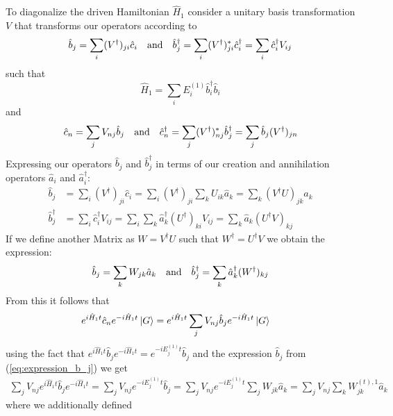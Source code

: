 \documentclass[11pt, a4paper]{article}
\theoremstyle{definition} %
\begin{document}
	 To diagonalize the driven Hamiltonian $\hat{H}_1$ consider a unitary basis transformation $V$ that transforms our operators according to
	\begin{equation}
		\hat{b}_j = \sum_i (V^\dagger)_{ji} \hat{c}_i \qq{and} \hat{b}_j^\dagger = \sum_i (V^\dagger)^*_{ji} \hat{c}_i^\dagger =\sum_i \hat{c}_i^\dagger V_{ij}
	\end{equation}
	such that 
	\begin{equation}
		\hat{H}_1 = \sum_i E_i^{(1)} \hat{b}_i^\dagger \hat{b}_i
	\end{equation}
	and 
	\begin{equation}
		\hat{c}_n = \sum_j V_{nj } \hat{b}_j \qq{and} \hat{c}_n^\dagger = \sum_j (V^\dagger)^*_{nj} \hat{b}_j^\dagger = \sum_j \hat{b}_j (V^\dagger)_{jn}
	\end{equation}
	Expressing our operators $\hat{b}_j$ and $\hat{b}_j^\dagger$ in terms of our creation and annihilation operators $\hat{a}_i$ and $\hat{a}_i^\dagger$:
	\begin{align}
		\hat{b}_j &= \sum_i (V^\dagger)_{ji} \hat{c}_i = \sum_i (V^\dagger)_{ji} \sum_k U_{ik} \hat{a}_k = \sum_k (V^\dagger U)_{jk} \hat{a}_k \\
		\hat{b}_j^\dagger &= \sum_i  \hat{c}_i^\dagger V_{ij} = \sum_i \sum_k \hat{a}_k^\dagger (U^\dagger)_{ki} V_{ij} = \sum_k \hat{a}_k (U^\dagger V)_{kj}
	\end{align}
	If we define another Matrix as $W = V^\dagger U$ such that $W^\dagger = U^\dagger V$ we obtain the expression:
	\begin{equation}
		\hat{b}_j = \sum_k W_{jk} \hat{a}_k \qq{and} \hat{b}_j^\dagger = \sum_k \hat{a}_k^\dagger (W^\dagger)_{kj}
		\label{eq:expression_b_j}
	\end{equation}
	From this it follows that
	\begin{align}
		e^{i \hat{H}_1 t} \hat{c}_n e^{-i \hat{H}_1 t} \ket{G} &=  e^{i \hat{H}_1 t} \sum_j V_{nj} \hat{b}_j e^{-i \hat{H}_1 t}\ket{G} 
	\end{align}
	using the fact that $e^{i \hat{H}_1 t} \hat{b}_j e^{-i \hat{H}_1 t} = e^{-i E_j^{(1)} t} \hat{b}_j$ and the expression $\hat{b}_j$ from (\ref{eq:expression_b_j}) we get
	\begin{align}
		\sum_j V_{nj} e^{i \hat{H}_1 t} \hat{b}_j e^{-i\hat{H}_1 t} = \sum_j V_{nj} e^{-i E_j^{(1)}t} \hat{b}_j = \sum_j V_{nj} e^{-i E_j^{(1)} t} \sum_j W_{jk} \hat{a}_k = \sum_j V_{nj} \sum_k W_{jk}^{(t), 1} \hat{a}_k
	\end{align}
	where we additionally defined
\end{document}

